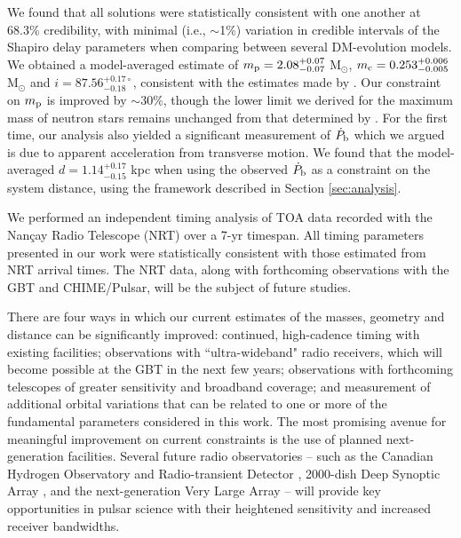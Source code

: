 \documentclass[twocolumn]{aastex63}
\newcommand{\chimepsr}{CHIME/Pulsar}
\newcommand{\pbdot}{$\dot{P}_{\rm b}$}
\begin{document}
We found that all solutions were statistically consistent with one another at 68.3\% credibility, with minimal (i.e., $\sim$1\%) variation in credible intervals of the Shapiro delay parameters when comparing between several DM-evolution models. We obtained a model-averaged estimate of $m_{\rm p} = 2.08^{+0.07}_{-0.07}$ M$_\odot$, $m_{\rm c} = 0.253^{+0.006}_{-0.005}$ M$_\odot$ and $i = 87.56^{+0.17\circ}_{-0.18}$, consistent with the estimates made by \citet{cfr+20}. Our constraint on $m_{\rm p}$ is improved by $\sim$30\%, though the lower limit we derived for the maximum mass of neutron stars remains unchanged from that determined by \citet{cfr+20}. For the first time, our analysis also yielded a significant measurement of \pbdot{} which we argued is due to apparent acceleration from transverse motion. We found that the model-averaged $d = 1.14^{+0.17}_{-0.15}$ kpc when using the observed \pbdot{} as a constraint on the system distance, using the framework described in Section \ref{sec:analysis}.

We performed an independent timing analysis of TOA data recorded with the Nan\c{c}ay Radio Telescope (NRT) over a 7-yr timespan. All timing parameters presented in our work were statistically consistent with those estimated from NRT arrival times. The NRT data, along with forthcoming observations with the GBT and \chimepsr, will be the subject of future studies.

There are four ways in which our current estimates of the masses, geometry and distance can be significantly improved: continued, high-cadence timing with existing facilities; observations with ``ultra-wideband" radio receivers, which will become possible at the GBT in the next few years; observations with forthcoming telescopes of greater sensitivity and broadband coverage; and measurement of additional orbital variations that can be related to one or more of the fundamental parameters considered in this work. The most promising avenue for meaningful improvement on current constraints is the use of planned next-generation facilities. Several future radio observatories -- such as the Canadian Hydrogen Observatory and Radio-transient Detector \citep[CHORD;][]{vlg+19}, 2000-dish Deep Synoptic Array \citep[DSA-2000;][]{hrw+19}, and the next-generation Very Large Array \citep[ngVLA; e.g.,][]{cha18} -- will provide key opportunities in pulsar science with their heightened sensitivity and increased receiver bandwidths. 
\end{document}
